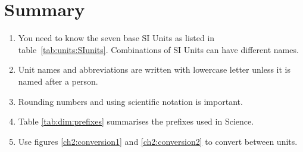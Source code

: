 \documentclass[10pt,a4paper,titlepage,twoside,openright]{report}
\begin{document}

\section{Summary}
\begin{enumerate}
\item You need to know the seven base SI Units as listed in table~\ref{tab:units:SIunits}. Combinations of SI Units can have different names.
\item Unit names and abbreviations are written with lowercase letter unless it is named after a person.
\item Rounding numbers and using scientific notation is important.
\item Table \ref{tab:dim:prefixes} summarises the prefixes used in Science.
\item Use figures \ref{ch2:conversion1} and \ref{ch2:conversion2} to convert between units.
\end{enumerate}

\pagebreak[4]
\end{document}
